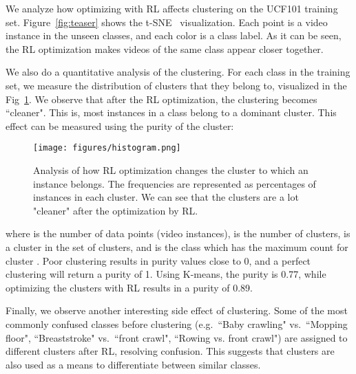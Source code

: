 \documentclass[runningheads]{llncs}
\begin{document}
We analyze how optimizing with RL affects clustering on the UCF101 training set. Figure~\ref{fig:teaser} shows the t-SNE~\cite{tsne} visualization. Each point is a video instance in the unseen classes, and each color is a class label. As it can be seen, the RL optimization makes videos of the same class appear closer together. 


We also do a quantitative analysis of the clustering. For each class in the training set, we measure the distribution of clusters that they belong to, visualized in the Fig~\ref{fig:histogram}. We observe that after the RL optimization, the clustering becomes ``cleaner". This is, most instances in a class belong to a dominant cluster. This effect can be measured using the purity of the cluster: 

\begin{figure}
    \centering
    \texttt{[image: figures/histogram.png]}
    \caption{Analysis of how RL optimization changes the cluster to which an instance belongs. The frequencies are represented as percentages of instances in each cluster. We can see that the clusters are a lot "cleaner" after the optimization by RL.}
    \label{fig:histogram}
\end{figure}



where  is the number of data points (video instances),  is the number of clusters,  is a cluster in the set of clusters, and  is the class which has the maximum count for cluster .  
Poor clustering results in purity values close to 0, and a perfect clustering will return a purity of 1. Using K-means, the purity is 0.77, while optimizing the clusters with RL results in a purity of 0.89.

Finally, we observe another interesting side effect of clustering. Some of the most commonly confused classes before clustering (e.g.~``Baby crawling" vs.~``Mopping floor", ``Breaststroke" vs.~``front crawl", ``Rowing vs. front crawl") are assigned to different clusters after RL, resolving confusion. This suggests that clusters are also used as a means to differentiate between similar classes. 
\end{document}
